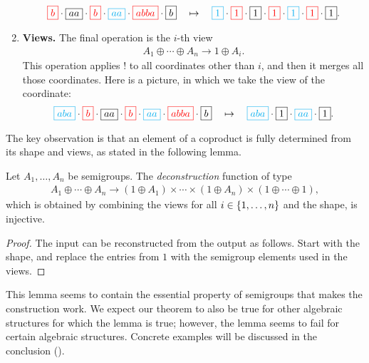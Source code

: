 \begin{enumerate}
\begin{align*}
            {\color{red}\boxed{b}} \cdot 
            \boxed{aa} \cdot 
            {\color{red}\boxed{b}} \cdot 
            {\color{cyan}\boxed{aa}} \cdot 
            {\color{red}\boxed{abba}} \cdot 
            \boxed{b}
            \quad \mapsto \quad  
            {\color{cyan}\boxed{1}} \cdot 
            {\color{red}\boxed{1}} \cdot 
            \boxed{1} \cdot 
            {\color{red}\boxed{1}} \cdot 
            {\color{cyan}\boxed{1}} \cdot 
            {\color{red}\boxed{1}} \cdot 
            \boxed{1}.
        \end{align*}
        \item \textbf{Views.} The final operation is the $i$-th view 
        \begin{align*}
        A_1 \oplus \cdots \oplus A_n \to 1 \oplus A_i.
        \end{align*}
        This operation applies $!$ to all coordinates other than $i$, and then it merges all those coordinates. Here is a picture, in which we take the view of the  coordinate:
        \begin{align*}
            {\color{cyan}\boxed{aba}} \cdot 
            {\color{red}\boxed{b}} \cdot 
            \boxed{aa} \cdot 
            {\color{red}\boxed{b}} \cdot 
            {\color{cyan}\boxed{aa}} \cdot 
            {\color{red}\boxed{abba}} \cdot 
            \boxed{b}
            \quad \mapsto \quad  
            {\color{cyan}\boxed{aba}} \cdot 
            {\boxed{1}} \cdot 
            {\color{cyan}\boxed{aa}} \cdot 
            \boxed{1}.
        \end{align*}
        
\end{enumerate}


The key observation is that an element of a coproduct is fully determined from its shape and views, as stated in the following lemma. 

\begin{proposition}
\label{prop:views} Let $A_1,\ldots,A_n$ be semigroups. The \emph{deconstruction} function of type
\begin{align*}
A_1 \oplus \cdots \oplus A_n \longrightarrow (1 \oplus A_1) \times \cdots \times (1 \oplus A_n) \times (1 \oplus \cdots \oplus 1),
\end{align*}
which is obtained by combining the views for all $i \in \{1,\ldots,n\}$ and the shape, is injective. 
\end{proposition}
\begin{proof}
    The input can be reconstructed from the output as follows.
    Start with the shape, and replace the entries from $1$ with the semigroup elements used in the views.
\end{proof}
This lemma seems to contain the essential property of semigroups that makes the construction work. We expect our theorem to also be true for other algebraic structures for which the lemma is true; however, the lemma seems to fail for certain algebraic structures. Concrete examples will be discussed in the conclusion ().

